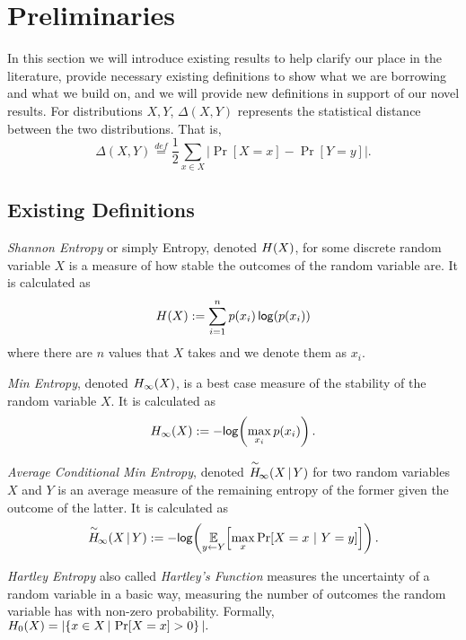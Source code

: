 
\section{Preliminaries}
In this section we will introduce existing results to help clarify our place in the literature, provide necessary existing definitions to show what we are borrowing and what we build on, and we will provide new definitions in support of our novel results.  For distributions $X, Y$, $\Delta(X, Y)$ represents the statistical distance between the two distributions.  That is, 
\[
\Delta(X, Y)\overset{def}= \frac{1}{2}\sum_{x \in X} \left| \Pr[X=x] - \Pr[Y=y]\right|.
\]

\subsection{Existing Definitions}

\begin{definition}[Entropy]
    \emph{Shannon Entropy} or simply Entropy, denoted $H\!\left(X\right)$, for some discrete random variable $X$ is a measure of how stable the outcomes of the random variable are. It is calculated as \[H\!\left(X\right) := \sum\limits_{i=1}^n p\!\left(x_i\right)\mathsf{log}\!\left(p\!\left(x_i\right)\right)\] where there are $n$ values that $X$ takes and we denote them as $x_i$. 
\end{definition}

\begin{definition}
    \emph{Min Entropy}, denoted $H_{\infty}\!\left(X\right)$, is a best case measure of the stability of the random variable $X$. It is calculated as \[H_{\infty}\!\left(X\right) := -\mathsf{log}\!\left(\max\limits_{x_i} p(x_i)\right).\]  
\end{definition}

\begin{definition}
    \emph{Average Conditional Min Entropy}, denoted $\overset{\sim}{H}\!_{\infty}\!\left(X\,|\,Y\right)$ for two random variables $X$ and $Y$ is an average measure of the remaining entropy of the former given the outcome of the latter. It is calculated as \[ \overset{\sim}{H}\!_{\infty}\!\left(X\,|\,Y\right) := -\mathsf{log}\!\left(\operatorname*{\mathbb{E}}\limits_{y \leftarrow Y}\!\left[\max\limits_{x} \Pr\!\left[X = x\ |\ Y = y\right]\right]\right).\] 
\end{definition}

\begin{definition}
    \emph{Hartley Entropy} also called \emph{Hartley's Function} measures the uncertainty of a random variable in a basic way, measuring the number of outcomes the random variable has with non-zero probability. Formally, $
    H_0\!\left(X\right) = | \!\left\{ x \in X\,|\, \Pr\!\left[X = x\right] > 0 \right\}|.
    $
\end{definition}

